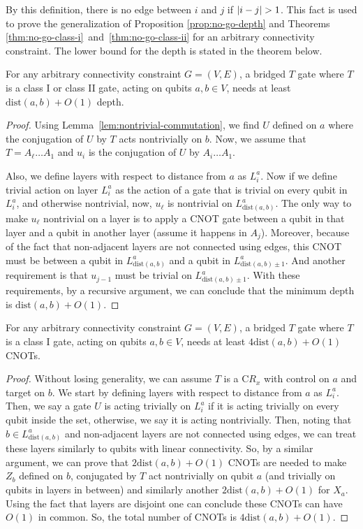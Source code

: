 By this definition, there is no edge between $i$ and $j$ if $\abs{i-j} > 1$. This fact is used to prove the generalization of Proposition \ref{prop:no-go-depth} and Theorems \ref{thm:no-go-class-i}~and~\ref{thm:no-go-class-ii} for an arbitrary connectivity constraint. The lower bound for the depth is stated in the theorem below.
\begin{proposition}
    For any arbitrary connectivity constraint $G=(V,E)$, a bridged $T$ gate where $T$ is a class I or class II gate, acting on qubits $a, b \in V$, needs at least $\mathrm{dist}(a,b) + O(1)$ depth.
\end{proposition}
\begin{proof}
  Using Lemma~\ref{lem:nontrivial-commutation}, we find $U$ defined on $a$ where the conjugation of $U$ by $T$ acts nontrivially on $b$. Now, we assume that $T = A_\ell \dots A_1$ and $u_i$ is the conjugation of $U$ by $A_i \dots A_1$. 
  
  Also, we define layers with respect to distance from $a$ as $L^{a}_i$. Now if we define trivial action on layer $L^a_i$ as the action of a gate that is trivial on every qubit in $L^a_i$, and otherwise nontrivial, now, $u_\ell$ is nontrivial on $L^a_{\mathrm{dist}(a,b)}$. The only way to make $u_\ell$ nontrivial on a layer is to apply a CNOT gate between a qubit in that layer and a qubit in another layer (assume it happens in $A_j$). Moreover, because of the fact that non-adjacent layers are not connected using edges, this CNOT must be between a qubit in $L^a_{\mathrm{dist}(a,b)}$ and a qubit in $L^a_{\mathrm{dist}(a,b) \pm 1}$. And another requirement is that $u_{j - 1}$ must be trivial on $L^a_{\mathrm{dist}(a,b) \pm 1}$. With these requirements, by a recursive argument, we can conclude that the minimum depth is $\mathrm{dist}(a,b) + O(1)$.
\end{proof}


\begin{theorem}
    For any arbitrary connectivity constraint $G=(V,E)$, a bridged $T$ gate where $T$ is a class I gate, acting on qubits $a, b \in V$, needs at least $4 \mathrm{dist}(a,b) + O(1)$ CNOTs.
\end{theorem}

\begin{proof}
    Without losing generality, we can assume $T$ is a $\mathrm{C}R_x$ with control on $a$ and target on $b$. We start by defining layers with respect to distance from $a$ as $L^{a}_i$. Then, we say a gate $U$ is acting trivially on $L^{a}_i$ if it is acting trivially on every qubit inside the set, otherwise, we say it is acting nontrivially.
    Then, noting that $b \in L^{a}_{\mathrm{dist}(a,b)}$ and non-adjacent layers are not connected using edges, we can treat these layers similarly to qubits with linear connectivity. So, by a similar argument, we can prove that $2\mathrm{dist}(a,b) + O(1)$ CNOTs are needed to make $Z_b$ defined on $b$, conjugated by $T$ act nontrivially on qubit $a$ (and trivially on qubits in layers in between) and similarly another $2\mathrm{dist}(a,b) + O(1)$ for $X_a$.
    Using the fact that layers are disjoint one can conclude these CNOTs can have $O(1)$ in common. So, the total number of CNOTs is $4\mathrm{dist}(a,b) + O(1)$.
\end{proof}

